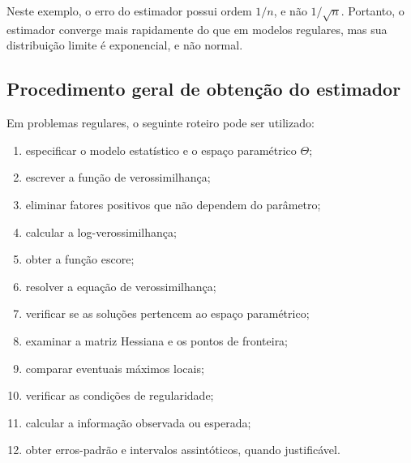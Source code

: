 \documentclass[
  letterpaper,
  DIV=11,
  numbers=noendperiod]{scrreprt}
\providecommand{\tightlist}{%
  \setlength{\itemsep}{0pt}\setlength{\parskip}{0pt}}\usepackage{longtable,booktabs,array}
\begin{document}
\begin{tcolorbox}[enhanced jigsaw, colback=white, leftrule=.75mm, colbacktitle=quarto-callout-note-color!10!white, breakable, titlerule=0mm, bottomtitle=1mm, title=\textcolor{quarto-callout-note-color}{\faInfo}\hspace{0.5em}{Interpretação}, colframe=quarto-callout-note-color-frame, toprule=.15mm, opacityback=0, bottomrule=.15mm, opacitybacktitle=0.6, arc=.35mm, toptitle=1mm, rightrule=.15mm, coltitle=black, left=2mm]

Neste exemplo, o erro do estimador possui ordem \(1/n\), e não
\(1/\sqrt n\). Portanto, o estimador converge mais rapidamente do que em
modelos regulares, mas sua distribuição limite é exponencial, e não
normal.

\end{tcolorbox}

\subsection{Procedimento geral de obtenção do
estimador}\label{procedimento-geral-de-obtenuxe7uxe3o-do-estimador}

Em problemas regulares, o seguinte roteiro pode ser utilizado:

\begin{enumerate}
\def\labelenumi{\arabic{enumi}.}
\tightlist
\item
  especificar o modelo estatístico e o espaço paramétrico \(\Theta\);
\item
  escrever a função de verossimilhança;
\item
  eliminar fatores positivos que não dependem do parâmetro;
\item
  calcular a log-verossimilhança;
\item
  obter a função escore;
\item
  resolver a equação de verossimilhança;
\item
  verificar se as soluções pertencem ao espaço paramétrico;
\item
  examinar a matriz Hessiana e os pontos de fronteira;
\item
  comparar eventuais máximos locais;
\item
  verificar as condições de regularidade;
\item
  calcular a informação observada ou esperada;
\item
  obter erros-padrão e intervalos assintóticos, quando justificável.
\end{enumerate}
\end{document}
